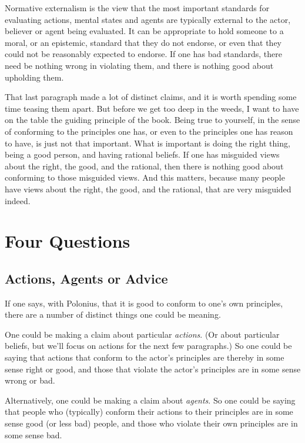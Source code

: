 \documentclass[
  10pt,
  letterpaper,
  twoside]{scrbook}
\begin{document}
Normative externalism is the view that the most important standards for
evaluating actions, mental states and agents are typically external to
the actor, believer or agent being evaluated. It can be appropriate to
hold someone to a moral, or an epistemic, standard that they do not
endorse, or even that they could not be reasonably expected to endorse.
If one has bad standards, there need be nothing wrong in violating them,
and there is nothing good about upholding them.

That last paragraph made a lot of distinct claims, and it is worth
spending some time teasing them apart. But before we get too deep in the
weeds, I want to have on the table the guiding principle of the book.
Being true to yourself, in the sense of conforming to the principles one
has, or even to the principles one has reason to have, is just not that
important. What is important is doing the right thing, being a good
person, and having rational beliefs. If one has misguided views about
the right, the good, and the rational, then there is nothing good about
conforming to those misguided views. And this matters, because many
people have views about the right, the good, and the rational, that are
very misguided indeed.

\section{Four Questions}\label{fourquestions}

\subsection{Actions, Agents or Advice}\label{actionsagentsoradvice}

If one says, with Polonius, that it is good to conform to one's own
principles, there are a number of distinct things one could be meaning.

One could be making a claim about particular \emph{actions}. (Or about
particular beliefs, but we'll focus on actions for the next few
paragraphs.) So one could be saying that actions that conform to the
actor's principles are thereby in some sense right or good, and those
that violate the actor's principles are in some sense wrong or bad.

Alternatively, one could be making a claim about \emph{agents}. So one
could be saying that people who (typically) conform their actions to
their principles are in some sense good (or less bad) people, and those
who violate their own principles are in some sense bad.
\end{document}
